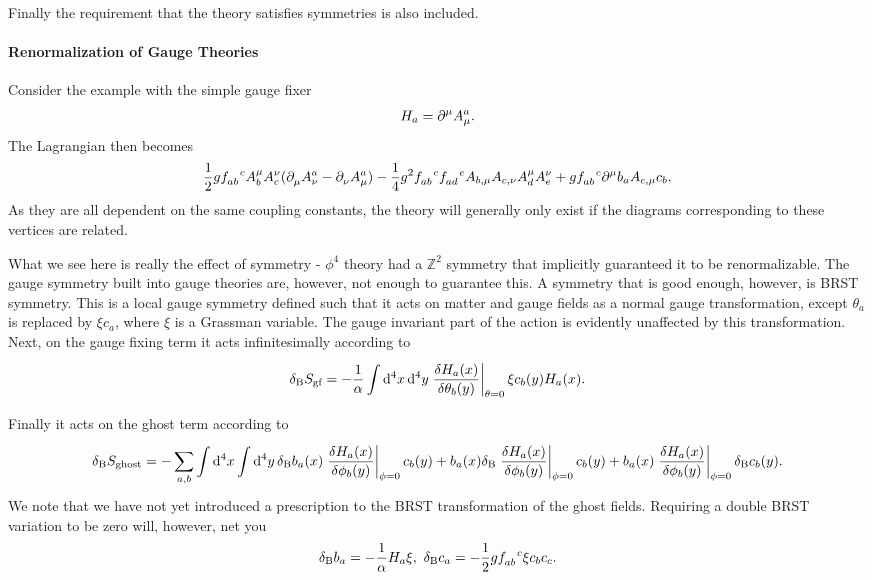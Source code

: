 Finally the requirement that the theory satisfies symmetries is also included.

\paragraph{Renormalization of Gauge Theories}
Consider the example with the simple gauge fixer
\begin{align*}
	H_{a} = \partial^{\mu}_{}A_{\mu}^{a}.
\end{align*}
The Lagrangian then becomes
\begin{align*}
	\frac{1}{2}g\srconst{ab}{c}A^{\mu}_{b}A^{\nu}_{c}(\del{}{\mu}A_{\nu}^{a} - \del{}{\nu}A_{\mu}^{a}) - \frac{1}{4}g^{2}\srconst{ab}{c}\srconst{ad}{e}A_{b, \mu}A_{c, \nu}A^{\mu}_{d}A^{\nu}_{e} + g\srconst{ab}{c}\del{\mu}{}b_{a}A_{c, \mu}c_{b}.
\end{align*}
As they are all dependent on the same coupling constants, the theory will generally only exist if the diagrams corresponding to these vertices are related.

What we see here is really the effect of symmetry - $\phi^{4}$ theory had a $\mathbb{Z}^{2}$ symmetry that implicitly guaranteed it to be renormalizable. The gauge symmetry built into gauge theories are, however, not enough to guarantee this. A symmetry that is good enough, however, is BRST symmetry. This is a local gauge symmetry defined such that it acts on matter and gauge fields as a normal gauge transformation, except $\theta_{a}$ is replaced by $\xi c_{a}$, where $\xi$ is a Grassman variable. The gauge invariant part of the action is evidently unaffected by this transformation. Next, on the gauge fixing term it acts infinitesimally according to
\begin{align*}
	\delta_{\text{B}}S_{\text{gf}} = -\frac{1}{\alpha}\inte{}{}\dd[4]{x}\dd[4]{y}\eval{\fdv{H_{a}(x)}{\theta_{b}(y)}}_{\theta = 0}\xi c_{b}(y)H_{a}(x).
\end{align*}
Finally it acts on the ghost term according to
\begin{align*}
	\delta_{\text{B}}S_{\text{ghost}} = -\sum\limits_{a, b}\integ[4]{}{}{x}{\integ[4]{}{}{y}{\delta_{\text{B}}b_{a}(x)\eval{\fdv{H_{a}(x)}{\phi_{b}(y)}}_{\phi = 0}c_{b}(y) + b_{a}(x)\delta_{\text{B}}\eval{\fdv{H_{a}(x)}{\phi_{b}(y)}}_{\phi = 0}c_{b}(y) + b_{a}(x)\eval{\fdv{H_{a}(x)}{\phi_{b}(y)}}_{\phi = 0}\delta_{\text{B}}c_{b}(y)}}.
\end{align*}
We note that we have not yet introduced a prescription to the BRST transformation of the ghost fields. Requiring a double BRST variation to be zero will, however, net you
\begin{align*}
	\delta_{\text{B}}b_{a} = -\frac{1}{\alpha}H_{a}\xi,\ \delta_{\text{B}}c_{a} = -\frac{1}{2}g\srconst{ab}{c}\xi c_{b}c_{c}.
\end{align*}

